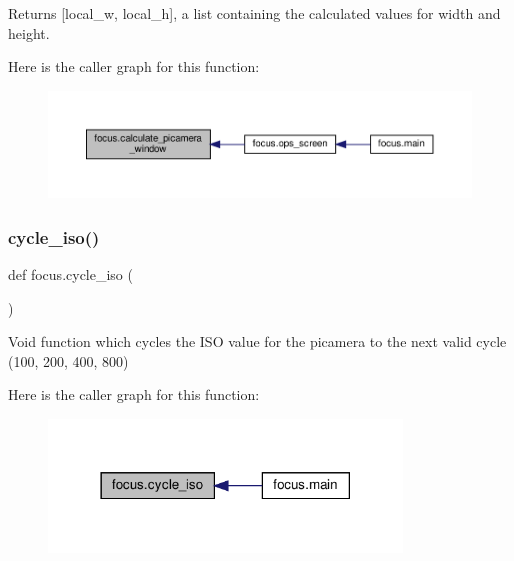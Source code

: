 \begin{DoxyReturn}{Returns}
\mbox{[}local\+\_\+w, local\+\_\+h\mbox{]}, a list containing the calculated values for width and height. 
\end{DoxyReturn}
Here is the caller graph for this function\+:\nopagebreak
\begin{figure}[H]
\begin{center}
\leavevmode
\includegraphics[width=350pt]{namespacefocus_ace593fb72d9a91bc93d3a25614a365d0_icgraph}
\end{center}
\end{figure}
\mbox{\label{namespacefocus_aa9bf3f199d1bf68a1e49ec229dcf8c38}} 
\subsubsection{\texorpdfstring{cycle\+\_\+iso()}{cycle\_iso()}}
{\footnotesize\ttfamily def focus.\+cycle\+\_\+iso (\begin{DoxyParamCaption}{ }\end{DoxyParamCaption})}



Void function which cycles the I\+SO value for the picamera to the next valid cycle (100, 200, 400, 800) 

Here is the caller graph for this function\+:\nopagebreak
\begin{figure}[H]
\begin{center}
\leavevmode
\includegraphics[width=266pt]{namespacefocus_aa9bf3f199d1bf68a1e49ec229dcf8c38_icgraph}
\end{center}
\end{figure}
\mbox{\label{namespacefocus_a8fb78b10ef91e414ac6707d45fcd0e5b}} 
